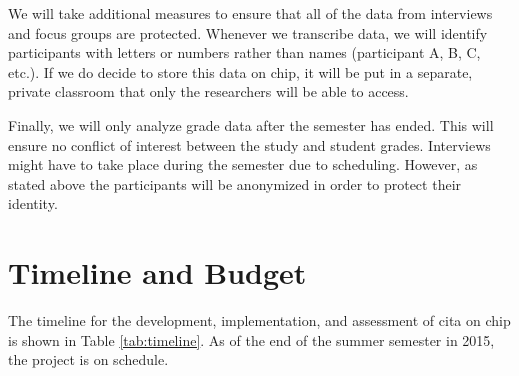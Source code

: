We will take additional measures to ensure that all of the data from interviews and focus groups are protected. Whenever we transcribe data, we will identify participants with letters or numbers rather than names (participant A, B, C, etc.). If we do decide to store this data on \gls{chip}, it will be put in a separate, private classroom that only the researchers will be able to access.

Finally, we will only analyze grade data after the semester has ended. This will ensure no conflict of interest between the study and student grades. Interviews might have to take place during the semester due to scheduling. However, as stated above the participants will be anonymized in order to protect their identity.

\section{Timeline and Budget}

The timeline for the development, implementation, and assessment of \gls{cita} on \gls{chip} is shown in Table \ref{tab:timeline}. As of the end of the summer semester in 2015, the project is on schedule.

\pagebreak

